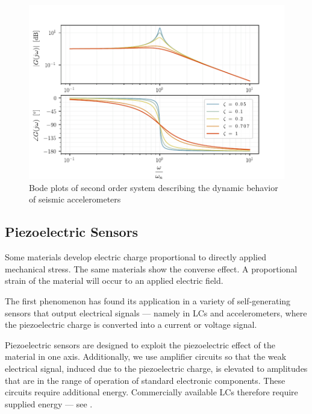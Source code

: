 \begin{figure}[!htb]
  \centering
  \includegraphics[scale=0.8]{figures/measurement/accel/seismic_accelerometer_edited}
  \caption[Second-Order System Bode plots]{Bode plots of second order system describing the dynamic behavior of seismic accelerometers%
    \label{fig:seismic_accelerometer_edited}}
\end{figure}

\subsection{Piezoelectric Sensors}
Some materials develop electric charge proportional to directly applied mechanical stress. The same materials show the converse effect. A proportional strain of the material will occur to an applied electric field.

The first phenomenon has found its application in a variety of self-generating sensors that output electrical signals --- namely in \ac{LC}s and accelerometers, where the piezoelectric charge is converted into a current or voltage signal.

Piezoelectric sensors are designed to exploit the piezoelectric effect of the material in one axis. Additionally, we use amplifier circuits so that the weak electrical signal, induced due to the piezoelectric charge, is elevated to amplitudes that are in the range of operation of standard electronic components. These circuits require additional energy. Commercially available \ac{LC}s therefore require supplied energy --- see .

